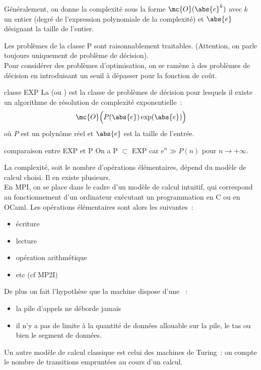 \begin{adjustwidth}{-3cm}{-3cm}
\begin{remarque}{}{}
    Généralement, on donne la complexité sous la forme $\mc{O}(\abs{e}^k)$ avec $k$ un entier (degré de l'expression polynomiale de la complexité) et $\abs{e}$ désignant la taille de l'entier.
\end{remarque}

\begin{remarque}{}{}
    Les problèmes de la classe P sont raisonnablement traitables. (Attention, on parle toujours uniquement de problème de décision).\\
    Pour considérer des problèmes d'optimisation, on se ramène à des problèmes de décision en introduisant un seuil à dépasser pour la fonction de coût.
\end{remarque}

\begin{remarque}{}{classe EXP}
    La  (ou ) est la classe de problèmes de décision pour lesquels il existe un algorithme de résolution de complexité exponentielle~:
    $$\mc{O}\Big(P(\abs{e})\exp(\abs{e})\Big)$$
    où $P$ est un polynôme réel et $\abs{e}$ est la taille de l'entrée.
\end{remarque}

\begin{remarque}{}{comparaison entre EXP et P}
    On a P $\subset$ EXP car $e^n \gg P(n)$ pour $n \to +\infty$.
\end{remarque}

\begin{remarque}{}{}
    La complexité, soit le nombre d'opérations élémentaires, dépend du modèle de calcul choisi. Il en existe plusieurs.\\
    En MPI, on se place dans le cadre d'un modèle de calcul intuitif, qui correspond au fonctionnement d'un ordinateur exécutant un programmation en C ou en OCaml. Les opérations élémentaires sont alors les suivantes~:
    \begin{itemize}
        \item écriture
        \item lecture
        \item opération arithmétique
        \item etc (cf MP2I)
    \end{itemize}
    De plus on fait l'hypothèse que la machine dispose d'une ~:
    \begin{itemize}
        \item la pile d'appels ne déborde jamais
        \item il n'y a pas de limite à la quantité de données allouable sur la pile, le tas ou bien le segment de données.
    \end{itemize}
    Un autre modèle de calcul classique est celui des machines de Turing~: on compte le nombre de transitions empruntées au cours d'un calcul.
\end{remarque}


\end{adjustwidth}
